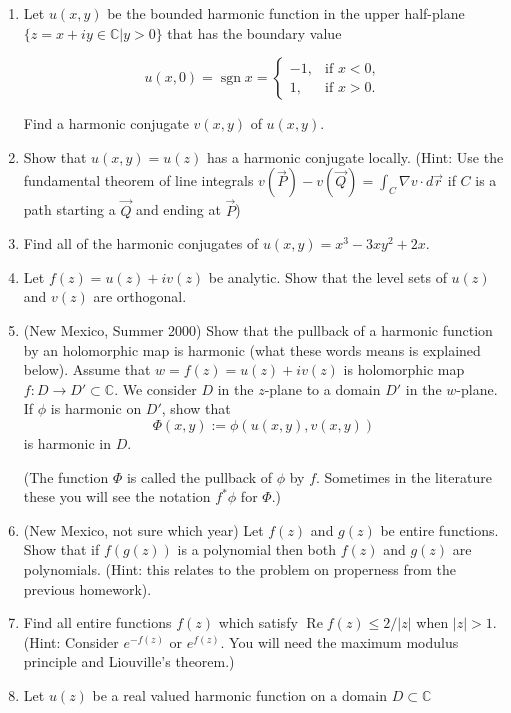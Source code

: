 \documentclass[a4paper,10pt]{article}
\newcommand{\CC}{\mathbb{C}}
\renewcommand{\Re}{\operatorname{Re}}
\begin{document}
\begin{enumerate}
	\item  Let $u(x,y)$ be the bounded harmonic function in the upper half-plane $\{z=x+iy\in \mathbb{C}|y>0\}$ that has the boundary value
	
	\[u(x,0)=\operatorname{sgn} x=\begin{cases} -1, & \text{if } x<0, \\ 1, & \text{if } x>0. \end{cases}\]
	
	Find a harmonic conjugate $v(x,y)$ of $u(x,y)$.
	
	\item  Show that $u(x,y) = u(z)$ has a harmonic conjugate locally. (Hint: Use the fundamental theorem of line integrals $v(\vec{P}) -v(\vec{Q})  = \int_{C} \nabla v \cdot d\vec{r}$ if $C$ is a path starting a $\vec{Q}$ and ending at $\vec{P}$)

	\item 
	Find all of the harmonic conjugates of $u(x,y) = x^3 - 3xy^2 + 2x$. 
	
	\item Let $f(z) = u(z) + i v(z)$ be analytic. 
	Show that the level sets of $u(z)$ and $v(z)$ are orthogonal.
	
	\item (New Mexico, Summer 2000)
	Show that the pullback of a harmonic function by an holomorphic map is harmonic (what these words means is explained below).
	Assume that $w = f(z) = u(z)+iv(z)$ is holomorphic map $f:D \to D' \subset \CC$. We consider $D$ in the $z$-plane to a domain $D'$ in the $w$-plane. 
	If $\phi$ is harmonic on $D'$, show that 
	$$ \Phi(x,y) := \phi(u(x,y),v(x,y))$$
	is harmonic in $D$. 
	
	(The function $\Phi$ is called the pullback of $\phi$ by $f$. Sometimes in the literature these you will see the notation $f^*\phi$ for $\Phi$.)
		
	\item (New Mexico, not sure which year) 
	Let $f(z)$ and $g(z)$ be entire functions. 
	Show that if $f(g(z))$ is a polynomial then both $f(z)$ and $g(z)$ are polynomials.
	(Hint: this relates to the problem on properness from the previous homework).
	
	\item Find all entire functions $f(z)$ which satisfy $\Re f(z) \leq 2/\vert z \vert$ when $\vert z \vert > 1$. (Hint: Consider $e^{-f(z)}$ or $e^{f(z)}$. You will need the maximum modulus principle and Liouville's theorem.)
	
	\item Let $u(z)$ be a real valued harmonic function on a domain $D \subset \CC$ 



\end{enumerate}
\end{document}
